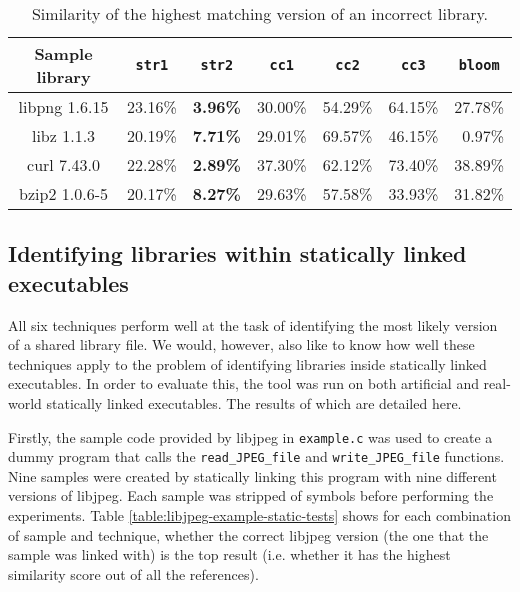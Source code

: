 \documentclass[twocolumn,a4paper]{IEEEtran} %
\begin{document}
\begin{table*}[h]
\begin{adjustbox}{center}
\centering
\small
\begin{tabular}{@{}c|rrrrrr@{}}
\toprule
\multicolumn{1}{c|}{Sample library}
              & \multicolumn{1}{c}{\texttt{str1}}
              & \multicolumn{1}{c}{\texttt{str2}}
              & \multicolumn{1}{c}{\texttt{cc1}}
              & \multicolumn{1}{c}{\texttt{cc2}}
              & \multicolumn{1}{c}{\texttt{cc3}}
              & \multicolumn{1}{c}{\texttt{bloom}}  \\ \midrule
libpng 1.6.15 & 23.16\% & \textbf{3.96\%}  & 30.00\%  & 54.29\%  & 64.15\%  & 27.78\%  \\
libz 1.1.3    & 20.19\% & \textbf{7.71\%}  & 29.01\%  & 69.57\%  & 46.15\%  & 0.97\%   \\
curl 7.43.0   & 22.28\% & \textbf{2.89\%}  & 37.30\%  & 62.12\%  & 73.40\%  & 38.89\%  \\
bzip2 1.0.6-5 & 20.17\% & \textbf{8.27\%}  & 29.63\%  & 57.58\%  & 33.93\%  & 31.82\%  \\
\bottomrule
\end{tabular}
\end{adjustbox}
\caption{Similarity of the highest matching version of an incorrect library.}
\label{table:similarity-second-highest-match-mips}
\end{table*}


\subsection{Identifying libraries within statically linked executables}
\label{sec:results-static}
All six techniques perform well at the task of identifying the most likely version of a shared library file. We would, however, also like to know how well these techniques apply to the problem of identifying libraries inside statically linked executables. In order to evaluate this, the tool was run on both artificial and real-world statically linked executables. The results of which are detailed here.

Firstly, the sample code provided by libjpeg in \texttt{example.c} was used to create a dummy program that calls the \texttt{read\_JPEG\_file} and \texttt{write\_JPEG\_file} functions. Nine samples were created by statically linking this program with nine different versions of libjpeg. Each sample was stripped of symbols before performing the experiments. Table \ref{table:libjpeg-example-static-tests} shows for each combination of sample and technique, whether the correct libjpeg version (the one that the sample was linked with) is the top result (i.e. whether it has the highest similarity score out of all the references).
\end{document}
